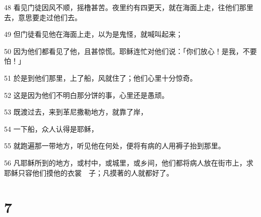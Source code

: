 \par 48 看见门徒因风不顺，摇橹甚苦。夜里约有四更天，就在海面上走，往他们那里去，意思要走过他们去。
\par 49 但门徒看见他在海面上走，以为是鬼怪，就喊叫起来；
\par 50 因为他们都看见了他，且甚惊慌。耶稣连忙对他们说：「你们放心！是我，不要怕！」
\par 51 於是到他们那里，上了船，风就住了；他们心里十分惊奇。
\par 52 这是因为他们不明白那分饼的事，心里还是愚顽。
\par 53 既渡过去，来到革尼撒勒地方，就靠了岸，
\par 54 一下船，众人认得是耶稣，
\par 55 就跑遍那一带地方，听见他在何处，便将有病的人用褥子抬到那里。
\par 56 凡耶稣所到的地方，或村中，或城里，或乡间，他们都将病人放在街市上，求耶稣只容他们摸他的衣裳　子；凡摸著的人就都好了。

\chapter{7}


